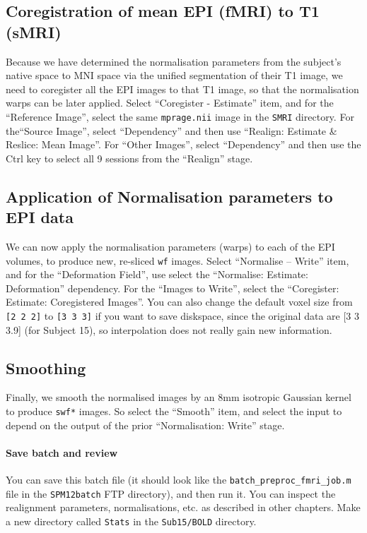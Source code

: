 \subsection{Coregistration of mean EPI (fMRI) to T1 (sMRI)}

Because we have determined the normalisation parameters from the subject's native space to MNI space via the unified segmentation of their T1 image, we need to coregister all the EPI images to that T1 image, so that the normalisation warps can be later applied. Select ``Coregister - Estimate'' item, and for the ``Reference Image'', select the same \texttt{mprage.nii} image in the \texttt{SMRI} directory. For the``Source Image'', select ``Dependency'' and then use ``Realign: Estimate \& Reslice: Mean Image''. For ``Other Images'', select ``Dependency'' and then use the Ctrl key to select all 9 sessions from the ``Realign'' stage.

\subsection{Application of Normalisation parameters to EPI data}

We can now apply the normalisation parameters (warps) to each of the EPI volumes, to produce new, re-sliced \texttt{wf} images. Select ``Normalise -- Write'' item, and for the ``Deformation Field'', use select the ``Normalise: Estimate: Deformation'' dependency. For the ``Images to Write'', select the ``Coregister: Estimate: Coregistered Images''. You can also change the default voxel size from \texttt{[2 2 2]} to \texttt{[3 3 3]} if you want to save diskspace, since the original data are [3 3 3.9] (for Subject 15), so interpolation does not really gain new information.

\subsection{Smoothing}

Finally, we smooth the normalised images by an 8mm isotropic Gaussian kernel to produce \texttt{swf*} images. So select the ``Smooth'' item, and select the input to depend on the output of the prior ``Normalisation: Write'' stage.

\paragraph{Save batch and review}

You can save this batch file (it should look like the \texttt{batch\_preproc\_fmri\_job.m} file in the \texttt{SPM12batch} FTP directory), and then run it. You can inspect the realignment parameters, normalisations, etc. as described in other chapters. Make a new directory called \texttt{Stats} in the \texttt{Sub15/BOLD} directory.

